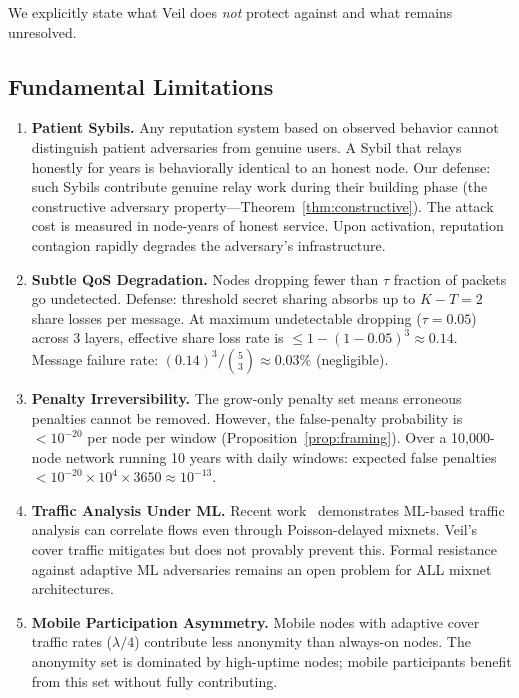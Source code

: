\documentclass[11pt,a4paper]{article}
\begin{document}
We explicitly state what Veil does \emph{not} protect against and what remains unresolved.

\subsection{Fundamental Limitations}

\begin{enumerate}
    \item \textbf{Patient Sybils.} Any reputation system based on observed behavior cannot distinguish patient adversaries from genuine users. A Sybil that relays honestly for years is behaviorally identical to an honest node. Our defense: such Sybils contribute genuine relay work during their building phase (the constructive adversary property---Theorem~\ref{thm:constructive}). The attack cost is measured in node-years of honest service. Upon activation, reputation contagion rapidly degrades the adversary's infrastructure.

    \item \textbf{Subtle QoS Degradation.} Nodes dropping fewer than $\tau$ fraction of packets go undetected. Defense: threshold secret sharing absorbs up to $K - T = 2$ share losses per message. At maximum undetectable dropping ($\tau = 0.05$) across 3 layers, effective share loss rate is $\leq 1 - (1-0.05)^3 \approx 0.14$. Message failure rate: $(0.14)^3 / \binom{5}{3} \approx 0.03\%$ (negligible).

    \item \textbf{Penalty Irreversibility.} The grow-only penalty set means erroneous penalties cannot be removed. However, the false-penalty probability is $< 10^{-20}$ per node per window (Proposition~\ref{prop:framing}). Over a 10,000-node network running 10 years with daily windows: expected false penalties $< 10^{-20} \times 10^4 \times 3650 \approx 10^{-13}$.

    \item \textbf{Traffic Analysis Under ML.} Recent work~\cite{mixflow} demonstrates ML-based traffic analysis can correlate flows even through Poisson-delayed mixnets. Veil's cover traffic mitigates but does not provably prevent this. Formal resistance against adaptive ML adversaries remains an open problem for ALL mixnet architectures.

    \item \textbf{Mobile Participation Asymmetry.} Mobile nodes with adaptive cover traffic rates ($\lambda/4$) contribute less anonymity than always-on nodes. The anonymity set is dominated by high-uptime nodes; mobile participants benefit from this set without fully contributing.


\end{enumerate}
\end{document}
